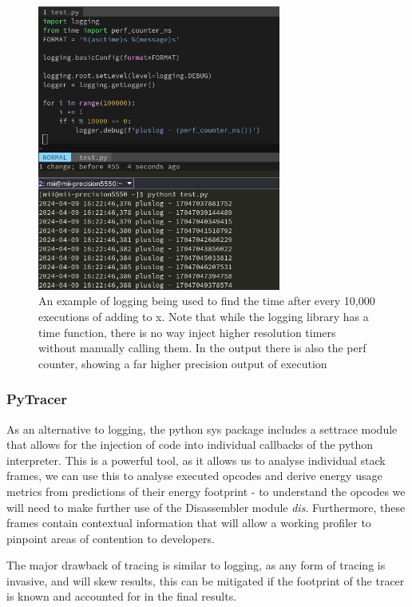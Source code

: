 \begin{figure}[H]
    \centering
    \includegraphics[width=8cm]{figures/introduction/python_log_time}
    \caption{An example of logging being used to find the time after every 10,000 executions of adding to x. Note that
    while the logging library has a time function, there is no way inject higher resolution timers without manually
    calling them. In the output there is also the perf counter, showing a far higher precision output of execution}
    \label{fig:python_log_time}
\end{figure}

\subsubsection{PyTracer}\label{subsubsec:pytracer}
As an alternative to logging, the python sys package includes a settrace module\cite{PythonSystrace} that allows for the
injection of code into individual callbacks of the python interpreter.
This is a powerful tool, as it allows us to analyse individual stack frames, we can use this to analyse executed opcodes
and derive energy usage metrics from predictions of their energy footprint - to understand the opcodes we will need
to make further use of the Disassembler module \textit{dis}\cite{PythonDis}.
Furthermore, these frames contain contextual information that will allow a working profiler to pinpoint areas of
contention to developers.

The major drawback of tracing is similar to logging, as any form of tracing is invasive, and will skew results, this can
be mitigated if the footprint of the tracer is known and accounted for in the final results.

